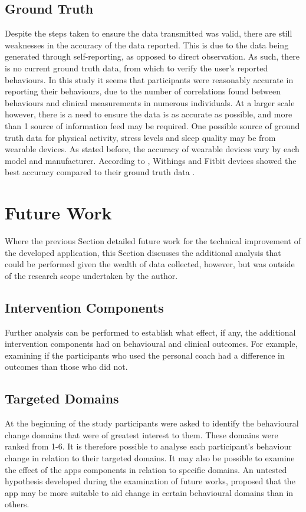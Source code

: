 \subsection{Ground Truth}
Despite the steps taken to ensure the data transmitted was valid, there are still weaknesses in the accuracy of the data reported. This is due to the data being generated through self-reporting, as opposed to direct observation. As such, there is no current ground truth data, from which to verify the user's reported behaviours. In this study it seems that participants were reasonably accurate in reporting their behaviours, due to the number of correlations found between behaviours and clinical measurements in numerous individuals. At a larger scale however, there is a need to ensure the data is as accurate as possible, and more than 1 source of information feed may be required.
One possible source of ground truth data for physical activity, stress levels and sleep quality may be from wearable devices. As stated before, the accuracy of wearable devices vary by each model and manufacturer. According to \citeauthor{Ferguson2015}, Withings and Fitbit devices showed the best accuracy compared to their ground truth data \cite{Ferguson2015}.

\section{Future Work}
Where the previous Section detailed future work for the technical improvement of the developed application, this Section discusses the additional analysis that could be performed given the wealth of data collected, however, but was outside of the research scope undertaken by the author.

\subsection{Intervention Components}
Further analysis can be performed to establish what effect, if any, the additional intervention components had on behavioural and clinical outcomes. For example, examining if the participants who used the personal coach had a difference in outcomes than those who did not.

\subsection{Targeted Domains}
At the beginning of the study participants were asked to identify the behavioural change domains that were of greatest interest to them. These domains were ranked from 1-6. It is therefore possible to analyse each participant's behaviour change in relation to their targeted domains. It may also be possible to examine the effect of the apps components in relation to specific domains. An untested hypothesis developed during the examination of future works, proposed that the app may be more suitable to aid change in certain behavioural domains than in others.


